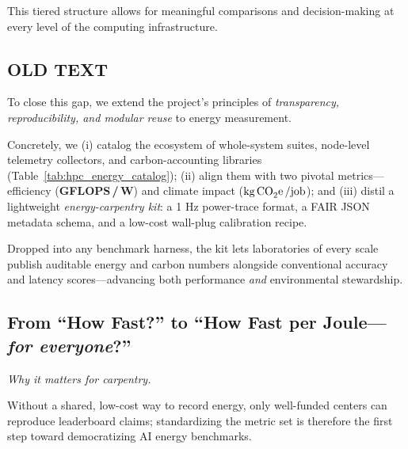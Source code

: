 \vspace{0.5cm}
This tiered structure allows for meaningful comparisons and decision-making at every level of the computing infrastructure.


\subsection{OLD TEXT}




To close this gap, we extend the project’s principles of \emph{transparency, reproducibility, and modular reuse} to energy measurement. 


Concretely, we (i) catalog the ecosystem of whole-system suites, node-level telemetry collectors, and carbon-accounting libraries (Table~\ref{tab:hpc_energy_catalog}); (ii) align them with two pivotal metrics—efficiency (\textbf{GFLOPS\,/\,W}) and climate impact (\(\text{kg\,CO}_{2}\text{e}\,/\text{job}\)); and (iii) distil a lightweight \emph{energy-carpentry kit}: a 1 Hz power-trace format, a FAIR JSON metadata schema, and a low-cost wall-plug calibration recipe. 


Dropped into any benchmark harness, the kit lets laboratories of every scale publish auditable energy and carbon numbers alongside conventional accuracy and latency scores—advancing both performance \emph{and} environmental stewardship.

\subsection{From ``How Fast?'' to ``How Fast per Joule—\textit{for everyone}?''}
\label{sec:energy:bg}

\textit{Why it matters for carpentry.}  

Without a shared, low-cost way to record energy, only well-funded centers can reproduce leaderboard claims; standardizing the metric set is therefore the first step toward democratizing AI energy benchmarks. 


